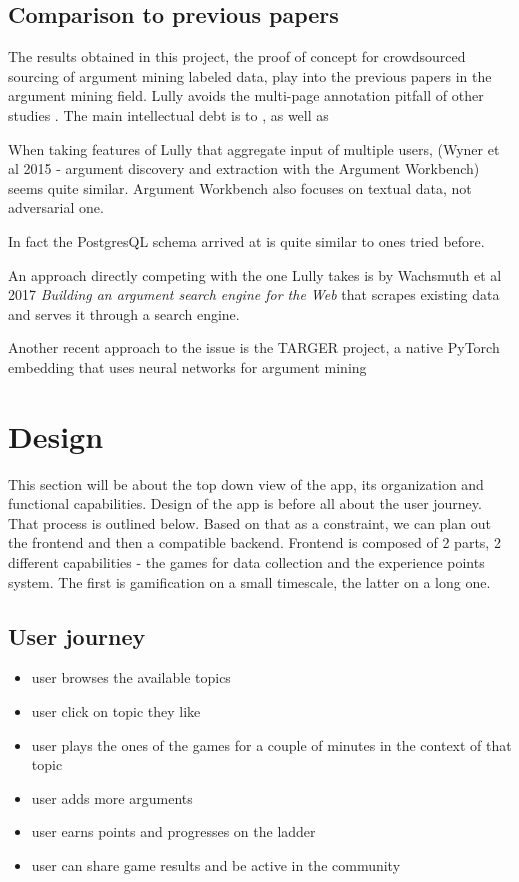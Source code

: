 \documentclass{report}
\begin{document}
\section{Comparison to previous papers}
The results obtained in this project, the proof of concept for crowdsourced sourcing of argument mining labeled data, play into the previous papers in the argument mining field.
Lully avoids the multi-page annotation pitfall of other studies \cite{teufel_towards_2009}.
The main intellectual debt is to \cite{von_ahn_designing_2008}, as well as \cite{poesio_phrase_2013}

When taking features of Lully that aggregate input of multiple users, (Wyner et al 2015 - argument discovery and extraction with the Argument Workbench)\cite{wyner_argument_2015} seems quite similar. Argument Workbench also focuses on textual data, not adversarial one. 

In fact the PostgresQL schema arrived at is quite similar to ones tried before.\cite{abbott_internet_2016}

An approach directly competing with the one Lully takes is by Wachsmuth et al 2017 \cite{wachsmuth_building_2017} \textit{Building an argument search engine for the Web} that scrapes existing data and serves it through a search engine.
\cite{fromm_towards_2022}

Another recent approach to the issue is the TARGER project, a native PyTorch embedding that uses neural networks for argument mining
\cite{chernodub_targer_2019}

\chapter{Design}
This section will be about the top down view of the app, its organization and functional capabilities.
Design of the app is before all about the user journey. That process is outlined below. Based on that as a constraint, we can plan out the frontend and then a compatible backend.
Frontend is composed of 2 parts, 2 different capabilities - the games for data collection and the experience points system. The first is gamification on a small timescale, the latter on a long one.

\section{User journey}
\begin{itemize}
  \item user browses the available topics
  \item user click on topic they like
  \item user plays the ones of the games for a couple of minutes in the context of that topic
  \item user adds more arguments
  \item user earns points and progresses on the ladder
  \item user can share game results and be active in the community
\end{itemize}
\end{document}
